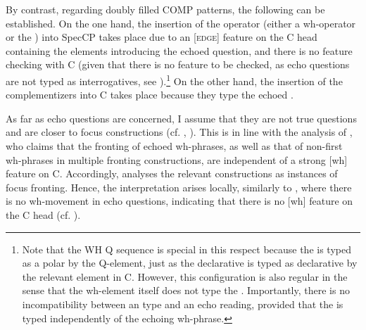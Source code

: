 \documentclass[output=paper,modfonts, hidelinks, newtxmath]{langscibook}
\begin{document}
By contrast, regarding  doubly filled COMP patterns, the following can be established. On the one hand, the insertion of the operator (either a wh-op\-er\-a\-tor or the ) into SpecCP takes place due to an [\textsc{edge}] feature on the C head containing the elements introducing the echoed question, and there is no feature checking with C (given that there is no  feature to be checked, as echo questions are not typed as interrogatives, see \citealt[363]{boskovic2002}).\footnote{Note that the WH Q sequence is special in this respect because the  is typed as a polar  by the Q-element, just as the declarative  is typed as declarative by the relevant element in C. However, this configuration is also regular in the sense that the wh-element itself does not type the . Importantly, there is no incompatibility between an   type and an echo reading, provided that the  is typed independently of the echoing wh-phrase.} On the other hand, the insertion of the complementizers into C takes place because they type the echoed .

As far as echo questions are concerned, I assume that they are not true questions and are closer to focus constructions (cf. \citealt{boskovic2002}, \citealt{artsein2002}). This is in line with the analysis of \citet{boskovic2002}, who claims that the fronting of echoed wh-phrases, as well as that of non-first wh-phrases in multiple fronting constructions, are independent of a strong [wh] feature on C. Accordingly, \citet[359--364]{boskovic2002} analyses the relevant constructions as instances of focus fronting. Hence, the  interpretation arises locally, similarly to , where there is no wh-movement in echo questions, indicating that there is no [wh] feature on the C head (cf. \citealt[363]{boskovic2002}).
\end{document}
